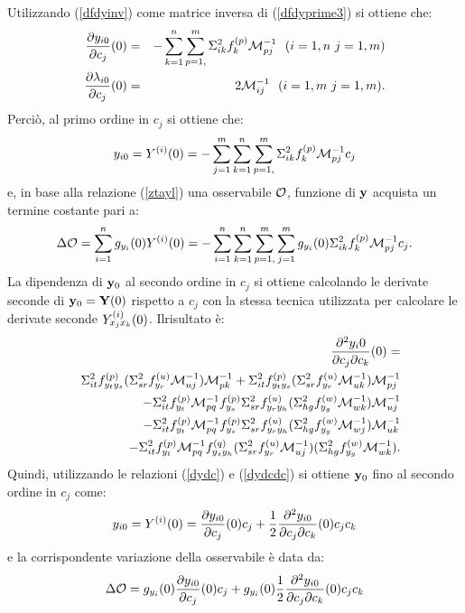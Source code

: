Utilizzando (\ref{dfdyinv}) come matrice inversa di (\ref{dfdyprime3}) si ottiene che:
\begin{eqnarray}
\label{dydc}
\frac{\partial y_{i0}}{\partial c_j}(0)&=&-\sum_{k=1}^n\sum_{p=1,}^m\Stwo_{ik}\fxes{p}_k\Minv_{pj}\ \ (i=1,n\ j=1,m)\\
\frac{\partial\lambda_{i0}}{\partial c_j}(0)&=&2\Minv_{ij}\ \ (i=1,m\ j=1,m).
\end{eqnarray} 
Perci\`o, al primo ordine in $c_j$ si ottiene che:\[y_{i0}=Y^{(i)}(0)=-\sum_{j=1}^m\sum_{k=1}^n\sum_{p=1,}^m\Sigma^2_{ik}f^{(p)}_k{\cal M}^{-1}_{pj}c_j\]
e, in base alla relazione (\ref{ztayl}) una osservabile ${\cal O}$, funzione di ${\bf y}$ acquista un termine costante pari a:\[\Delta{\cal O}=\sum_{i=1}^n g_{y_i}(0)Y^{(i)}(0)=-\sum_{i=1}^n\sum_{k=1}^n\sum_{p=1,}^m\sum_{j=1}^m g_{y_i}(0)\Sigma^2_{ik}f^{(p)}_k{\cal M}^{-1}_{pj}c_j.\]
La dipendenza di ${\bf y}_0$ al secondo ordine in $c_j$ si ottiene calcolando le
derivate seconde di ${\bf y}_0={\bf Y}(0)$ rispetto a $c_j$ con la stessa
tecnica utilizzata per calcolare le derivate seconde $Y^{(i)}_{x_jx_k}(0)$. Ilrisultato \`e:
\begin{eqnarray}
\label{dydcdc}
&&\frac{\partial^2 y_i0}{\partial c_j\partial c_k}(0)=\nonumber\\
&&\Sigma^2_{it}f^{(p)}_{y_ty_s}(\Sigma^2_{sr}f^{(u)}_{y_r}{\cal M}^{-1}_{uj}){\cal M}^{-1}_{pk}+\Sigma^2_{it}f^{(p)}_{y_ty_s}(\Sigma^2_{sr}f^{(u)}_{y_r}{\cal M}^{-1}_{uk}){\cal M}^{-1}_{pj}\nonumber\\
&&-\Sigma^2_{it}f^{(p)}_{y_t}{\cal M}^{-1}_{pq}f^{(p)}_{y_s}\Sigma^2_{sr}f^{(u)}_{y_ry_h}(\Sigma^2_{hg}f^{(w)}_{y_g}{\cal M}^{-1}_{wk}){\cal M}^{-1}_{uj}\nonumber\\
&&-\Sigma^2_{it}f^{(p)}_{y_t}{\cal M}^{-1}_{pq}f^{(p)}_{y_s}\Sigma^2_{sr}f^{(u)}_{y_ry_h}(\Sigma^2_{hg}f^{(w)}_{y_g}{\cal M}^{-1}_{wj}){\cal M}^{-1}_{uk}\nonumber\\
&&-\Sigma^2_{it}f^{(p)}_{y_t}{\cal M}^{-1}_{pq}f^{(q)}_{y_sy_h}(\Sigma^2_{sr}f^{(u)}_{y_r}{\cal M}^{-1}_{uj})(\Sigma^2_{hg}f^{(w)}_{y_g}{\cal M}^{-1}_{wk}).
\end{eqnarray}
Quindi, utilizzando le relazioni (\ref{dydc}) e (\ref{dydcdc}) si ottiene ${\bf y}_0$
fino al secondo ordine in $c_j$ come:\[y_{i0}=Y^{(i)}(0)=\frac{\partial y_{i0}}{\partial c_j}(0)c_j+\frac{1}{2}\frac{\partial^2 y_{i0}}{\partial c_j\partial c_k}(0)c_jc_k\]
e la corrispondente variazione della osservabile \`e data da:\[\Delta{\cal O}=g_{y_i}(0)\frac{\partial y_{i0}}{\partial c_j}(0)c_j+g_{y_i}(0)\frac{1}{2}\frac{\partial^2 y_{i0}}{\partial c_j\partial c_k}(0)c_jc_k\] 
